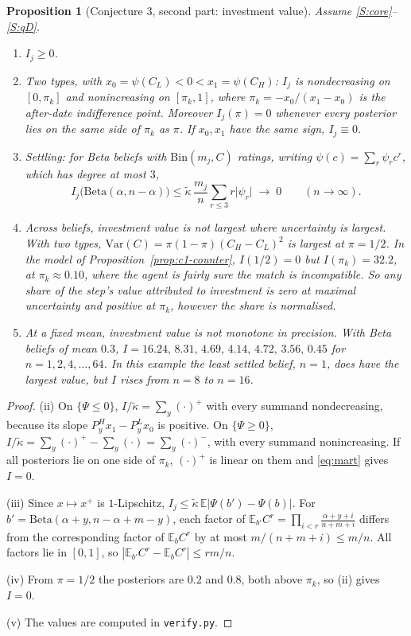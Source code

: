 \documentclass[11pt,a4paper]{article}
\newtheorem{proposition}[theorem]{Proposition}
\theoremstyle{definition}
\theoremstyle{remark}
\newcommand{\E}{\mathbb{E}}
\newcommand{\kt}{\tilde\kappa}
\begin{document}
\begin{proposition}[Conjecture 3, second part: investment value]\label{prop:inv}
Assume \ref{S:core}--\ref{S:qD}.
\begin{enumerate}[label=(\roman*)]
\item $I_j\ge0$.
\item \emph{Two types}, with $x_0=\psi(C_L)<0<x_1=\psi(C_H)$: $I_j$ is nondecreasing on $[0,\pi_k]$ and nonincreasing on $[\pi_k,1]$, where $\pi_k=-x_0/(x_1-x_0)$ is the after-date indifference point. Moreover $I_j(\pi)=0$ whenever every posterior lies on the same side of $\pi_k$ as $\pi$. If $x_0,x_1$ have the same sign, $I_j\equiv0$.
\item \emph{Settling:} for Beta beliefs with $\mathrm{Bin}(m_j,C)$ ratings, writing $\psi(c)=\sum_r\psi_rc^r$, which has degree at most $3$,
\[
I_j\bigl(\mathrm{Beta}(\alpha,n-\alpha)\bigr)\le\kt\,\frac{m_j}{n}\sum_{r\le3}r\lvert\psi_r\rvert\;\longrightarrow\;0\qquad(n\to\infty).
\]
\item \emph{Across beliefs, investment value is not largest where uncertainty is largest.} With two types, $\mathrm{Var}(C)=\pi(1-\pi)(C_H-C_L)^2$ is largest at $\pi=1/2$. In the model of Proposition~\ref{prop:c1-counter}, $I(1/2)=0$ but $I(\pi_k)=32.2$, at $\pi_k\approx0.10$, where the agent is fairly sure the match is incompatible. So any share of the step's value attributed to investment is zero at maximal uncertainty and positive at $\pi_k$, however the share is normalised.
\item \emph{At a fixed mean, investment value is not monotone in precision.} With Beta beliefs of mean $0.3$, $I=16.24,\,8.31,\,4.69,\,4.14,\,4.72,\,3.56,\,0.45$ for $n=1,2,4,\dots,64$. In this example the least settled belief, $n=1$, does have the largest value, but $I$ rises from $n=8$ to $n=16$.
\end{enumerate}
\end{proposition}

\begin{proof}
(ii) On $\{\Psi\le0\}$, $I/\kt=\sum_y(\cdot)^+$ with every summand nondecreasing, because its slope $P_y^Hx_1-P_y^Lx_0$ is positive. On $\{\Psi\ge0\}$, $I/\kt=\sum_y(\cdot)^+-\sum_y(\cdot)=\sum_y(\cdot)^-$, with every summand nonincreasing. If all posteriors lie on one side of $\pi_k$, $(\cdot)^+$ is linear on them and \eqref{eq:mart} gives $I=0$.

(iii) Since $x\mapsto x^+$ is $1$-Lipschitz, $I_j\le\kt\,\E|\Psi(b')-\Psi(b)|$. For $b'=\mathrm{Beta}(\alpha+y,n-\alpha+m-y)$, each factor of $\E_{b'}C^r=\prod_{i<r}\frac{\alpha+y+i}{n+m+i}$ differs from the corresponding factor of $\E_bC^r$ by at most $m/(n+m+i)\le m/n$. All factors lie in $[0,1]$, so $|\E_{b'}C^r-\E_bC^r|\le rm/n$.

(iv) From $\pi=1/2$ the posteriors are $0.2$ and $0.8$, both above $\pi_k$, so (ii) gives $I=0$.

(v) The values are computed in \texttt{verify.py}.
\end{proof}
\end{document}
